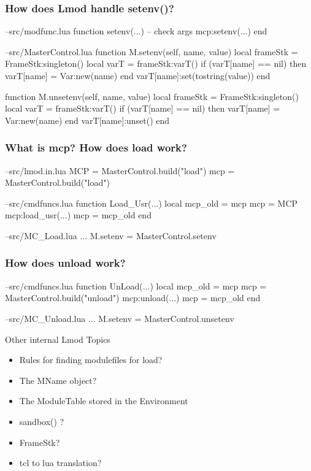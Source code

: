 \documentclass{beamer}
\begin{document}
\begin{frame}[fragile]
  \frametitle{How does Lmod handle setenv()?}
    {\tiny
\begin{semiverbatim}
--src/modfunc.lua
function setenv(...)
    -- check args
    mcp:setenv(...)
end

--src/MasterControl.lua
function M.setenv(self, name, value)
   local frameStk = FrameStk:singleton()
   local varT     = frameStk:varT()
   if (varT[name] == nil) then
      varT[name] = Var:new(name)
   end
   varT[name]:set(tostring(value))
end

function M.unsetenv(self, name, value)
   local frameStk  = FrameStk:singleton()
   local varT      = frameStk:varT()
   if (varT[name] == nil) then
      varT[name]   = Var:new(name)
   end
   varT[name]:unset()
end
\end{semiverbatim}
    }
\end{frame}

\begin{frame}[fragile]
  \frametitle{What is mcp? How does load work?}
    {\tiny
\begin{semiverbatim}
--src/lmod.in.lua
   MCP = MasterControl.build("load")
   mcp = MasterControl.build("load")

--src/cmdfuncs.lua
function Load\_Usr(...)
   local mcp\_old = mcp
   mcp = MCP
   mcp:load\_usr(...)
   mcp = mcp\_old
end

--src/MC\_Load.lua
...
M.setenv               = MasterControl.setenv
\end{semiverbatim}
    }
\end{frame}

\begin{frame}[fragile]
  \frametitle{How does unload work?}
    {\tiny
\begin{semiverbatim}
--src/cmdfuncs.lua
function UnLoad(...)
   local mcp\_old = mcp
   mcp = MasterControl.build("unload")
   mcp:unload(...)
   mcp = mcp\_old
end

--src/MC_Unload.lua
...
M.setenv               = MasterControl.unsetenv
\end{semiverbatim}
    }
\end{frame}

\begin{frame}{Other internal Lmod Topics}
  \begin{itemize}
    \item Rules for finding modulefiles for load?
    \item The MName object?
    \item The ModuleTable stored in the Environment
    \item sandbox() ?
    \item FrameStk?
    \item tcl to lua translation?
  \end{itemize}
\end{frame}
\end{document}
